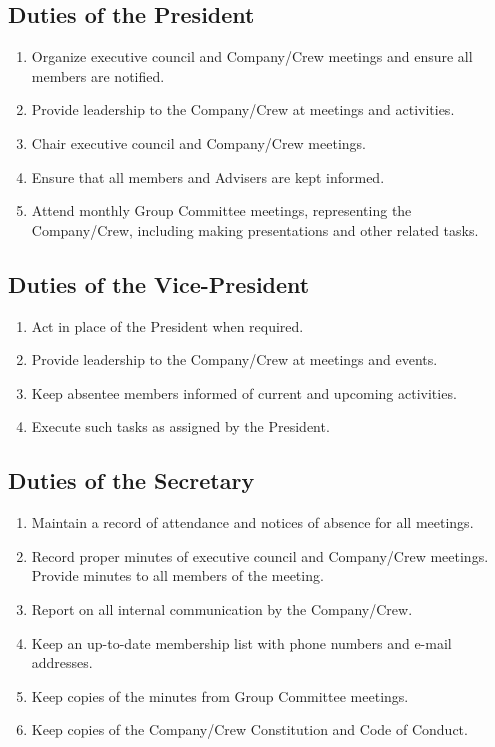 \documentclass{Service_Corps_Document}
\begin{document}
\subsection{Duties of the President}
\begin{enumerate}
	\item Organize executive council and Company/Crew meetings and ensure all members are notified.
	\item Provide leadership to the Company/Crew at meetings and activities. 
	\item Chair executive council and Company/Crew meetings.
	\item Ensure that all members and Advisers are kept informed.
	\item Attend monthly Group Committee meetings, representing the Company/Crew, including making presentations and other related tasks.
\end{enumerate}
\subsection{Duties of the Vice-President}
\begin{enumerate}
	\item Act in place of the President when required.
	\item Provide leadership to the Company/Crew at meetings and events. 
	\item Keep absentee members informed of current and upcoming activities.
	\item Execute such tasks as assigned by the President.
\end{enumerate}
\subsection{Duties of the Secretary}
\begin{enumerate}
	\item Maintain a record of attendance and notices of absence for all meetings.
	\item Record proper minutes of executive council and Company/Crew meetings.
	Provide minutes to all members of the meeting.
	\item Report on all internal communication by the Company/Crew.
	\item Keep an up-to-date membership list with phone numbers and e-mail addresses.
	\item Keep copies of the minutes from Group Committee meetings. 
	\item Keep copies of the Company/Crew Constitution and Code of Conduct.
\end{enumerate}
\end{document}
